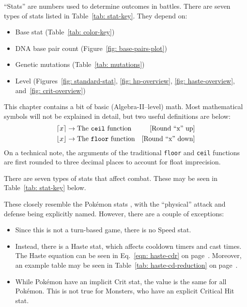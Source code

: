 
\def\tableWidth{0.5\textwidth}

\begin{tldr}
``Stats'' are numbers used to determine outcomes in battles. There are seven types of stats listed in Table~\ref{tab: stat-key}. They depend on:

\begin{itemize}
	\item{Base stat (Table~\ref{tab: color-key})}
	\item{DNA base pair count (Figure~\ref{fig: base-pairs-plot})}
	\item{Genetic mutations (Table~\ref{tab: mutations})}
	\item{Level (Figures~\ref{fig: standard-stat}, \ref{fig: hp-overview}, \ref{fig: haste-overview}, and~\ref{fig: crit-overview})}
\end{itemize}

\end{tldr}

\localtoc



This chapter contains a bit of basic (Algebra-II--level) math. Most mathematical symbols will not be explained in detail, but two useful definitions are below:
\begin{align*}
	\lceil x\rceil &\rightarrow \text{The \texttt{ceil} function} & \text{[Round ``x'' up]}\\
	\lfloor x\rfloor &\rightarrow \text{The \texttt{floor} function} & \text{[Round ``x'' down]}\\
\end{align*}
\noindent On a technical note, the arguments of the traditional \texttt{floor} and \texttt{ceil} functions are first rounded to three decimal places to account for float imprecision.

There are seven types of stats that affect combat. These may be seen in Table~\ref{tab: stat-key} below. 

		
\noindent These closely resemble the Pok\'{e}mon stats \cite{pkmn-stats}, with the ``physical'' attack and defense being explicitly named. However, there are a couple of exceptions:

\begin{itemize}
	\item{Since this is not a turn-based game, there is no Speed stat.}
	\item{Instead, there is a Haste stat, which affects cooldown timers and cast times. The Haste equation can be seen in Eq.~\eqref{eqn: haste-cdr} on page~\pageref{eqn: haste-cdr}. Moreover, an example table may be seen in Table~\ref{tab: haste-cd-reduction} on page~\pageref{tab: haste-cd-reduction}.}
	\item{While Pok\'{e}mon have an implicit Crit stat, the value is the same for all Pok\'{e}mon. This is not true for Monsters, who have an explicit Critical Hit stat.}
\end{itemize}

